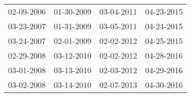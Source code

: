 \begin{supertabular}{llll}
 02-09-2006 &  01-30-2009 &  03-04-2011 &  04-23-2015 \\
 03-23-2007 &  01-31-2009 &  03-05-2011 &  04-24-2015 \\
 03-24-2007 &  02-01-2009 &  02-02-2012 &  04-25-2015 \\
 02-29-2008 &  03-12-2010 &  02-02-2012 &  04-28-2016 \\
 03-01-2008 &  03-13-2010 &  02-03-2012 &  04-29-2016 \\
 03-02-2008 &  03-14-2010 &  02-07-2013 &  04-30-2016 \\
\end{supertabular}
